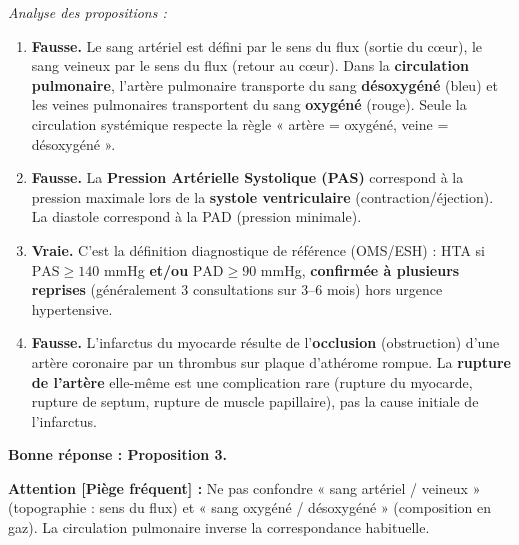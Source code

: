 \documentclass[11pt]{article}
\begin{document}
\begin{corrige}
\emph{Analyse des propositions :}
\begin{enumerate}
    \item \textbf{Fausse.} Le sang artériel est défini par le sens du flux (sortie du cœur), le sang veineux par le sens du flux (retour au cœur). Dans la \textbf{circulation pulmonaire}, l'artère pulmonaire transporte du sang \textbf{désoxygéné} (bleu) et les veines pulmonaires transportent du sang \textbf{oxygéné} (rouge). Seule la circulation systémique respecte la règle « artère = oxygéné, veine = désoxygéné ».
    \item \textbf{Fausse.} La \textbf{Pression Artérielle Systolique (PAS)} correspond à la pression maximale lors de la \textbf{systole ventriculaire} (contraction/éjection). La diastole correspond à la PAD (pression minimale).
    \item \textbf{Vraie.} C'est la définition diagnostique de référence (OMS/ESH) : HTA si $\text{PAS} \ge 140$ mmHg \textbf{et/ou} $\text{PAD} \ge 90$ mmHg, \textbf{confirmée à plusieurs reprises} (généralement 3 consultations sur 3--6 mois) hors urgence hypertensive.
    \item \textbf{Fausse.} L'infarctus du myocarde résulte de l'\textbf{occlusion} (obstruction) d'une artère coronaire par un thrombus sur plaque d'athérome rompue. La \textbf{rupture de l'artère} elle-même est une complication rare (rupture du myocarde, rupture de septum, rupture de muscle papillaire), pas la cause initiale de l'infarctus.
\end{enumerate}
\textbf{Bonne réponse : Proposition 3.}
\par\textbf{Attention [Piège fréquent] :} Ne pas confondre « sang artériel / veineux » (topographie : sens du flux) et « sang oxygéné / désoxygéné » (composition en gaz). La circulation pulmonaire inverse la correspondance habituelle.
\end{corrige}
\end{document}
